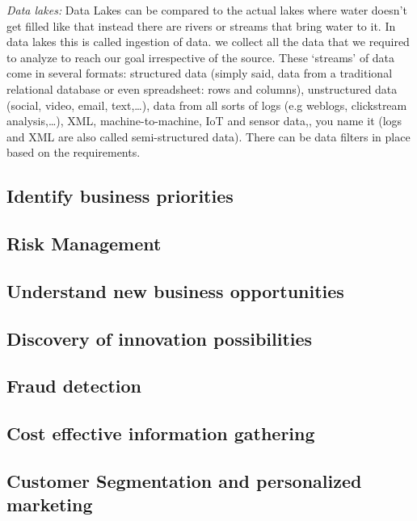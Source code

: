 \documentclass[sigconf]{acmart}
\begin{document}
\textit{Data lakes:} Data Lakes can be compared to the actual lakes where water doesn't get filled like that instead there are rivers or streams that bring water to it. In data lakes this is called ingestion of data. we collect all the data that we required to analyze to reach our goal irrespective of the source. These ‘streams’ of data come in several formats: structured data (simply said, data from a traditional relational database or even spreadsheet: rows and columns), unstructured data (social, video, email, text,…), data from all sorts of logs (e.g weblogs, clickstream analysis,…), XML, machine-to-machine, IoT and sensor data,, you name it (logs and XML are also called semi-structured data). There can be data filters in place based on the requirements.



\subsection{Identify business priorities}

\subsection{Risk Management}

\subsection{Understand new business opportunities}

\subsection{Discovery of innovation possibilities}

\subsection{Fraud detection}

\subsection{Cost effective information gathering}

\subsection{Customer Segmentation and personalized marketing}
\end{document}
